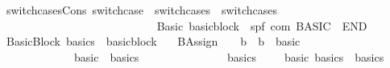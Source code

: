 \begin{isabellebody}
\ \ {\isachardoublequoteopen}{\isacharunderscore}switchcasesCons{\isachardoublequoteclose}{\isacharcolon}{\isacharcolon}\ {\isachardoublequoteopen}switchcase\ {\isasymRightarrow}\ switchcases\ {\isasymRightarrow}\ switchcases{\isachardoublequoteclose}\isanewline
\ \ \ \ \ \ \ \ \ \ \ \ \ \ \ \ \ \ \ \ \ \ \ {\isacharparenleft}{\isachardoublequoteopen}{\isacharunderscore}{\isacharslash}\ {\isacharbar}\ {\isacharunderscore}{\isachardoublequoteclose}{\isacharparenright}\ \isanewline
\ \ {\isachardoublequoteopen}{\isacharunderscore}Basic{\isachardoublequoteclose}{\isacharcolon}{\isacharcolon}\ {\isachardoublequoteopen}basicblock\ {\isasymRightarrow}\ {\isacharparenleft}{\isacharprime}s{\isacharcomma}{\isacharprime}p{\isacharcomma}{\isacharprime}f{\isacharparenright}\ com{\isachardoublequoteclose}\ {\isacharparenleft}{\isachardoublequoteopen}{\isacharparenleft}{}BASIC{\isacharslash}\ {\isacharparenleft}{\isacharunderscore}{\isacharparenright}{\isacharslash}\ END{\isacharparenright}{\isachardoublequoteclose}\ {\isacharbrackleft}{}{}{\isacharbrackright}\ {}{}{\isacharparenright}\isanewline
\ \ {\isachardoublequoteopen}{\isacharunderscore}BasicBlock{\isachardoublequoteclose}{\isacharcolon}{\isacharcolon}\ {\isachardoublequoteopen}basics\ {\isasymRightarrow}\ basicblock{\isachardoublequoteclose}\ {\isacharparenleft}{\isachardoublequoteopen}{\isacharunderscore}{\isachardoublequoteclose}{\isacharparenright}\isanewline
\ \ {\isachardoublequoteopen}{\isacharunderscore}BAssign{\isachardoublequoteclose}\ \ \ {\isacharcolon}{\isacharcolon}\ {\isachardoublequoteopen}{\isacharprime}b\ {\isacharequal}{\isachargreater}\ {\isacharprime}b\ {\isacharequal}{\isachargreater}\ basic{\isachardoublequoteclose}\ \ \ \ {\isacharparenleft}{\isachardoublequoteopen}{\isacharparenleft}{\isacharunderscore}\ {\isacharcolon}{\isacharequal}{\isacharequal}{\isacharslash}\ {\isacharunderscore}{\isacharparenright}{\isachardoublequoteclose}\ {\isacharbrackleft}{}{}{\isacharcomma}\ {}{}{\isacharbrackright}\ {}{}{\isacharparenright}\isanewline
\ \ {\isachardoublequoteopen}{\isachardoublequoteclose}\ \ \ \ \ \ \ \ \ \ \ {\isacharcolon}{\isacharcolon}\ {\isachardoublequoteopen}basic\ {\isasymRightarrow}\ basics{\isachardoublequoteclose}\ \ \ \ \ \ \ \ \ \ \ \ \ {\isacharparenleft}{\isachardoublequoteopen}{\isacharunderscore}{\isachardoublequoteclose}{\isacharparenright}\isanewline
\ \ {\isachardoublequoteopen}{\isacharunderscore}basics{\isachardoublequoteclose}\ \ \ \ {\isacharcolon}{\isacharcolon}\ {\isachardoublequoteopen}{\isacharbrackleft}basic{\isacharcomma}\ basics{\isacharbrackright}\ {\isasymRightarrow}\ basics{\isachardoublequoteclose}\ {\isacharparenleft}{\isachardoublequoteopen}{\isacharunderscore}{\isacharcomma}{\isacharslash}\ {\isacharunderscore}{\isachardoublequoteclose}{\isacharparenright}\isanewline

\end{isabellebody}
